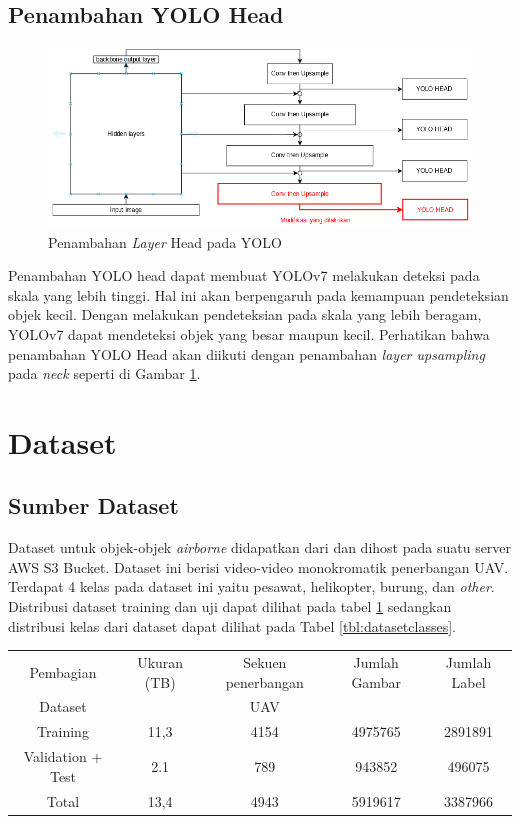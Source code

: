   \subsection{Penambahan YOLO Head}
    \begin{figure}[ht]
      \centering
      \includegraphics[scale=0.65]{figures/addmorehead.png}
      \caption{Penambahan \emph{Layer} Head pada YOLO}
      \label{fig:addmorehead}
    \end{figure}
    Penambahan YOLO head dapat membuat YOLOv7 melakukan deteksi pada skala yang lebih tinggi.
    Hal ini akan berpengaruh pada kemampuan pendeteksian objek kecil.
    Dengan melakukan pendeteksian pada skala yang lebih beragam, YOLOv7 dapat mendeteksi objek yang besar maupun kecil.
    Perhatikan bahwa penambahan YOLO Head akan diikuti dengan penambahan \emph{layer upsampling} pada \emph{neck} seperti di Gambar \ref{fig:addmorehead}.
    
\section{Dataset}
  \subsection{Sumber Dataset}
    Dataset untuk objek-objek \emph{airborne} didapatkan dari \textcite{aot_dataset} dan dihost pada suatu server AWS S3 Bucket.
    Dataset ini berisi video-video monokromatik penerbangan UAV.
    Terdapat 4 kelas pada dataset ini yaitu pesawat, helikopter, burung, dan \emph{other}.
    Distribusi dataset training dan uji dapat dilihat pada tabel \ref{tbl:datasettraintest} sedangkan distribusi kelas dari dataset dapat dilihat pada Tabel \ref{tbl:datasetclasses}.
    \begin{table}[h]
      \centering
      \label{tbl:datasettraintest}
      \begin{tabular}{|c|c|c|c|c|}
        \hline
        Pembagian & Ukuran (TB) & Sekuen penerbangan & Jumlah Gambar & Jumlah Label\\
        Dataset &  & UAV &  & \\
        \hline
        Training & 11,3 & 4154 & 4975765 & 2891891\\
        \hline
        Validation + Test &2.1 &789 & 943852 & 496075\\
        \hline
        Total &13,4 &4943 & 5919617 & 3387966\\
        \hline
      \end{tabular}
    \end{table}

